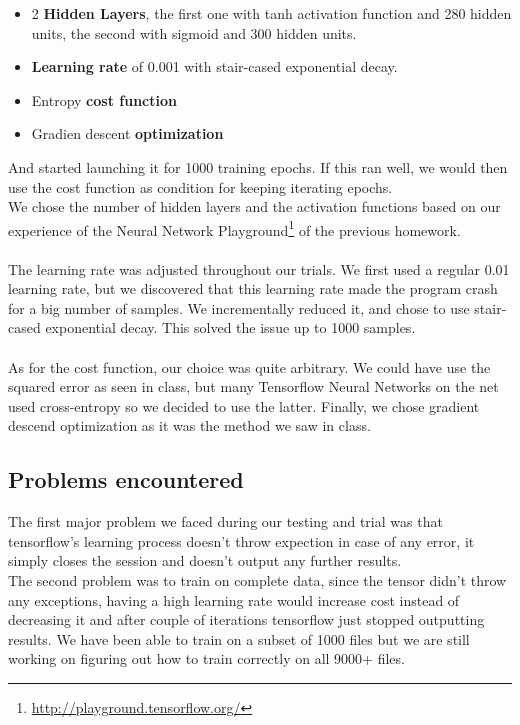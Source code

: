 \documentclass{article} %
\begin{document}
\begin{enumerate}
					\begin{itemize}
						\item 2 \textbf{Hidden Layers}, the first one with tanh activation function and 280 hidden units, the second with sigmoid and 300 hidden units.
						\item \textbf{Learning rate} of 0.001 with stair-cased exponential decay.
						\item Entropy \textbf{cost function}
						\item Gradien descent \textbf{optimization}
					\end{itemize}
					And started launching it for 1000 training epochs. If this ran well, we would then use the cost function as condition for keeping iterating epochs.\\
					\newline
					We chose the number of hidden layers and the activation functions based on our experience of the Neural Network Playground\footnote{\url{http://playground.tensorflow.org/}} of the previous homework.\\\\
					The learning rate was adjusted throughout our trials. We first used a regular 0.01 learning rate, but we discovered that this learning rate made the program crash for a big number of samples. We incrementally reduced it, and chose to use stair-cased exponential decay. This solved the issue up to 1000 samples.\\\\
					As for the cost function, our choice was quite arbitrary. We could have use the squared error as seen in class, but many Tensorflow Neural Networks on the net used cross-entropy so we decided to use the latter. Finally, we chose gradient descend optimization as it was the method we saw in class.
			\end{enumerate}


        \subsection{Problems encountered}
        The first major problem we faced during our testing and trial was that tensorflow's learning process doesn't throw expection in case of any error, it simply closes the session and doesn't output any further results.\\
        \newline
        The second problem was to train on complete data, since the tensor didn't throw any exceptions, having a high learning rate would increase cost instead of decreasing it and after couple of iterations tensorflow just stopped outputting results. We have been able to train on a subset of 1000 files but we are still working on figuring out how to train correctly on all 9000+ files.
        
\end{document}
